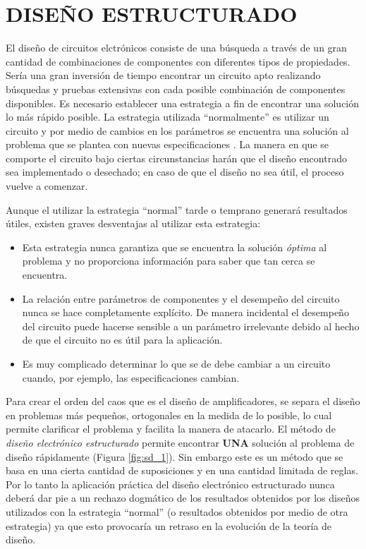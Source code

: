 \documentclass[10pt,twocolumn,twoside,letterpaper]{IEEEtran}
\begin{document}
{\section{{\bf DISE\~NO ESTRUCTURADO}}
El dise\~no de circuitos elctr\'onicos consiste de una b\'usqueda a trav\'es de un gran cantidad de combinaciones de componentes con diferentes tipos de propiedades. Ser\'ia una gran inversi\'on de tiempo encontrar un circuito apto realizando b\'usquedas y pruebas extensivas con cada posible combinaci\'on de componentes disponibles. Es necesario establecer una estrategia a fin de encontrar una soluci\'on lo m\'as r\'apido posible. La estrategia utilizada ``normalmente'' es utilizar un circuito y por medio de cambios en los par\'ametros se encuentra una soluci\'on al pro\-ble\-ma que se plantea con nuevas especificaciones \cite{verhoeven}. La manera en que se comporte el circuito bajo ciertas circunstancias har\'an que el dise\~no encontrado sea implementado o desechado; en caso de que el dise\~no no sea \'util, el proceso vuelve a comenzar.

Aunque el utilizar la estrategia ``normal'' tarde o temprano generar\'a resultados \'utiles, e\-xis\-ten graves desventajas al utilizar esta estrategia:

\begin{itemize}
\item Esta estrategia nunca garantiza que se encuentra la soluci\'on {\it \'optima} al problema y no proporciona informaci\'on para saber que tan cerca se encuentra.
\item La relaci\'on entre par\'ametros de componentes y el desempe\~no del circuito nunca se hace completamente expl\'icito. De manera incidental el desempe\~no del circuito puede hacerse sensible a un par\'ametro irrelevante debido al hecho de que el circuito no es \'util para la aplicaci\'on.
\item Es muy complicado determinar lo que se de debe cambiar a un circuito cuando, por ejemplo, las especificaciones cambian.
\end{itemize}

Para crear el orden del caos que es el dise\~no de amplificadores, se separa el dise\~no en pro\-ble\-mas m\'as peque\~nos, ortogonales en la medida de lo posible, lo cual permite clarificar el problema y facilita la manera de atacarlo. El m\'etodo de {\it dise\~no electr\'onico estructurado} \cite{verhoeven,nordholt} permite encontrar {\bf UNA} soluci\'on al pro\-ble\-ma de dise\~no r\'apidamente (Figura \ref{fig:sd_1}). Sin embargo este es un m\'etodo que se basa en una cierta cantidad de suposiciones y en una cantidad limitada de reglas. Por lo tanto la aplicaci\'on pr\'actica del dise\~no electr\'onico estructurado nunca deber\'a dar pie a un rechazo dogm\'atico de los resultados obtenidos por los dise\~nos utilizados con la estrategia ``normal'' (o resultados obtenidos por medio de otra estrategia) ya que esto provocar\'ia un retraso en la evoluci\'on de la teor\'ia de dise\~no.

}
\end{document}
